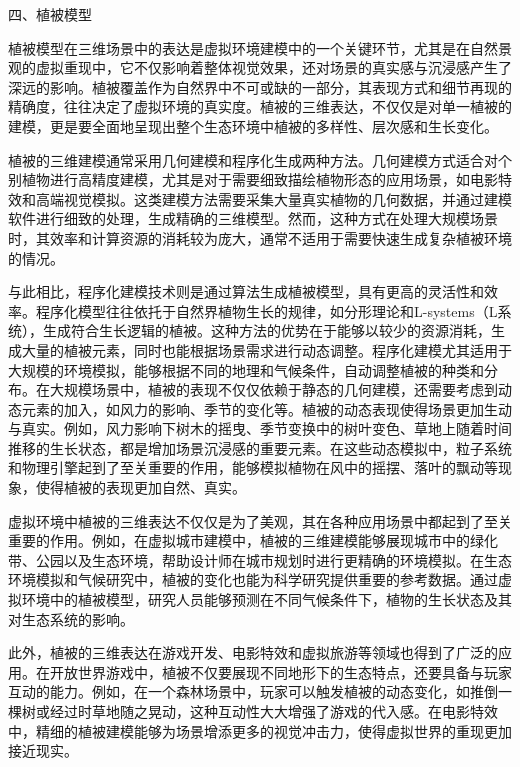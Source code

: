 四、植被模型

植被模型在三维场景中的表达是虚拟环境建模中的一个关键环节，尤其是在自然景观的虚拟重现中，它不仅影响着整体视觉效果，还对场景的真实感与沉浸感产生了深远的影响。植被覆盖作为自然界中不可或缺的一部分，其表现方式和细节再现的精确度，往往决定了虚拟环境的真实度。植被的三维表达，不仅仅是对单一植被的建模，更是要全面地呈现出整个生态环境中植被的多样性、层次感和生长变化。

植被的三维建模通常采用几何建模和程序化生成两种方法。几何建模方式适合对个别植物进行高精度建模，尤其是对于需要细致描绘植物形态的应用场景，如电影特效和高端视觉模拟。这类建模方法需要采集大量真实植物的几何数据，并通过建模软件进行细致的处理，生成精确的三维模型。然而，这种方式在处理大规模场景时，其效率和计算资源的消耗较为庞大，通常不适用于需要快速生成复杂植被环境的情况。

与此相比，程序化建模技术则是通过算法生成植被模型，具有更高的灵活性和效率。程序化模型往往依托于自然界植物生长的规律，如分形理论和L-systems（L系统），生成符合生长逻辑的植被。这种方法的优势在于能够以较少的资源消耗，生成大量的植被元素，同时也能根据场景需求进行动态调整。程序化建模尤其适用于大规模的环境模拟，能够根据不同的地理和气候条件，自动调整植被的种类和分布。在大规模场景中，植被的表现不仅仅依赖于静态的几何建模，还需要考虑到动态元素的加入，如风力的影响、季节的变化等。植被的动态表现使得场景更加生动与真实。例如，风力影响下树木的摇曳、季节变换中的树叶变色、草地上随着时间推移的生长状态，都是增加场景沉浸感的重要元素。在这些动态模拟中，粒子系统和物理引擎起到了至关重要的作用，能够模拟植物在风中的摇摆、落叶的飘动等现象，使得植被的表现更加自然、真实。

虚拟环境中植被的三维表达不仅仅是为了美观，其在各种应用场景中都起到了至关重要的作用。例如，在虚拟城市建模中，植被的三维建模能够展现城市中的绿化带、公园以及生态环境，帮助设计师在城市规划时进行更精确的环境模拟。在生态环境模拟和气候研究中，植被的变化也能为科学研究提供重要的参考数据。通过虚拟环境中的植被模型，研究人员能够预测在不同气候条件下，植物的生长状态及其对生态系统的影响。

此外，植被的三维表达在游戏开发、电影特效和虚拟旅游等领域也得到了广泛的应用。在开放世界游戏中，植被不仅要展现不同地形下的生态特点，还要具备与玩家互动的能力。例如，在一个森林场景中，玩家可以触发植被的动态变化，如推倒一棵树或经过时草地随之晃动，这种互动性大大增强了游戏的代入感。在电影特效中，精细的植被建模能够为场景增添更多的视觉冲击力，使得虚拟世界的重现更加接近现实。

